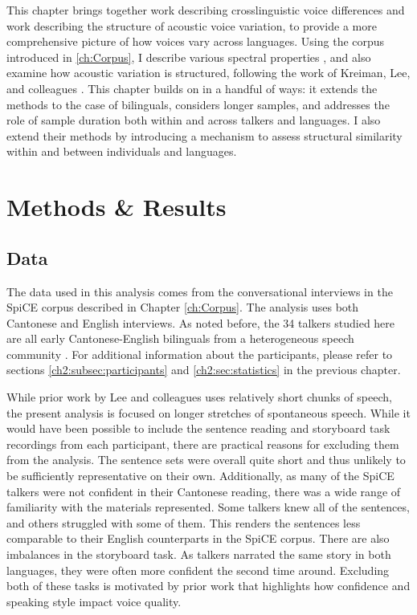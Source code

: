 This chapter brings together work describing crosslinguistic voice differences and work describing the structure of acoustic voice variation, to provide a more comprehensive picture of how voices vary across languages. Using the corpus introduced in \ref{ch:Corpus}, I describe various spectral properties \citet[e.g.][]{ng_2012_ltas}, and also examine how acoustic variation is structured, following the work of Kreiman, Lee, and colleagues \citep{kreiman_2014_theory,lee_2019_acoustic}. This chapter builds on \citet{lee_2019_acoustic} in a handful of ways: it extends the methods to the case of bilinguals, considers longer samples, and addresses the role of sample duration both within and across talkers and languages. I also extend their methods by introducing a mechanism to assess structural similarity within and between individuals and languages. 

\section{Methods \& Results}\label{ch3:sec:methods_results}

\subsection{Data}\label{ch3:sec:data}

The data used in this analysis comes from the conversational interviews in the SpiCE corpus described in Chapter \ref{ch:Corpus}. The analysis uses both Cantonese and English interviews. As noted before, the 34 talkers studied here are all early Cantonese-English bilinguals from a heterogeneous speech community \citep{liang_2015_china}. For additional information about the participants, please refer to sections \ref{ch2:subsec:participants} and \ref{ch2:sec:statistics} in the previous chapter. 

While prior work by Lee and colleagues \citep[e.g.,][]{lee_2019_acoustic} uses relatively short chunks of speech, the present analysis is focused on longer stretches of spontaneous speech. While it would have been possible to include the sentence reading and storyboard task recordings from each participant, there are practical reasons for excluding them from the analysis. The sentence sets were overall quite short and thus unlikely to be sufficiently representative on their own. Additionally, as many of the SpiCE talkers were not confident in their Cantonese reading, there was a wide range of familiarity with the materials represented. Some talkers knew all of the sentences, and others struggled with some of them. This renders the sentences less comparable to their English counterparts in the SpiCE corpus. There are also imbalances in the storyboard task. As talkers narrated the same story in both languages, they were often more confident the second time around. Excluding both of these tasks is motivated by prior work that highlights how confidence \citep{jarvinen_2013_speaking} and speaking style \citep{lee_2017_bilingual} impact voice quality. 

